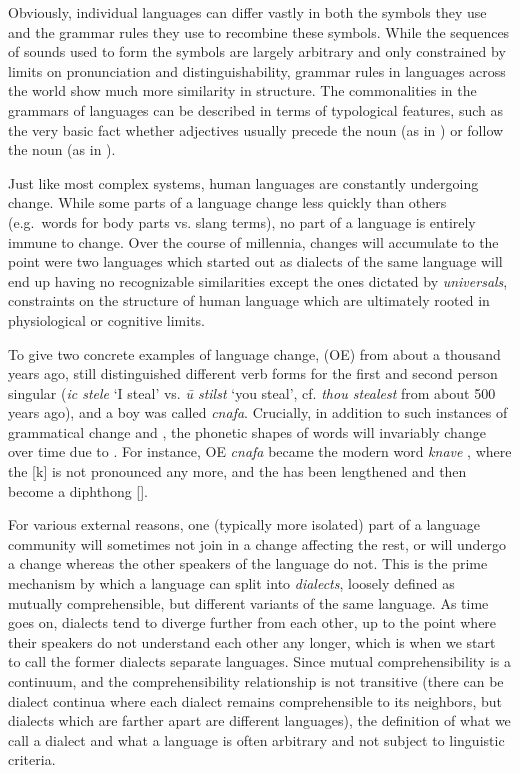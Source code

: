 Obviously, individual languages can differ vastly in both the symbols they use and the grammar rules they use to recombine these symbols. While the sequences of sounds used to form the symbols are largely arbitrary and only constrained by limits on pronunciation and distinguishability, grammar rules in languages across the world show much more similarity in structure. The commonalities in the grammars of languages can be described in terms of typological features, such as the very basic fact whether adjectives usually precede the noun (as in ) or follow the noun (as in ).

Just like most complex systems, human languages are constantly undergoing change. While some parts of a language change less quickly than others (e.g.\ words for body parts vs. slang terms), no part of a language is entirely immune to change. Over the course of millennia, changes will accumulate to the point were two languages which started out as dialects of the same language will end up having no recognizable similarities except the ones dictated by \textit{universals}, constraints on the structure of human language which are ultimately rooted in physiological or cognitive limits.

To give two concrete examples of language change,  (OE) from about a thousand years ago, still distinguished different verb forms for the first and second person singular (\textit{ic stele} `I steal' vs. \textit{\th{}\={u} stilst} `you steal', cf. \textit{thou stealest} from about 500 years ago), and a boy was called \textit{cnafa}. Crucially, in addition to such instances of grammatical change and , the phonetic shapes of words will invariably change over time due to . For instance, OE \textit{cnafa} \ipa{[knAvA]} became the modern word \textit{knave} \ipa{[neIv]}, where the [k] is not pronounced any more, and the \ipa{[A]} has been lengthened and then become a diphthong [].

For various external reasons, one (typically more isolated) part of a language community will sometimes not join in a change affecting the rest, or will undergo a change whereas the other speakers of the language do not. This is the prime mechanism by which a language can split into \textit{dialects}, loosely defined as mutually comprehensible, but different variants of the same language. As time goes on, dialects tend to diverge further from each other, up to the point where their speakers do not understand each other any longer, which is when we start to call the former dialects separate languages. Since mutual comprehensibility is a continuum, and the comprehensibility relationship is not transitive (there can be dialect continua where each dialect remains comprehensible to its neighbors, but dialects which are farther apart are different languages), the definition of what we call a dialect and what a language is often arbitrary and not subject to linguistic criteria.

